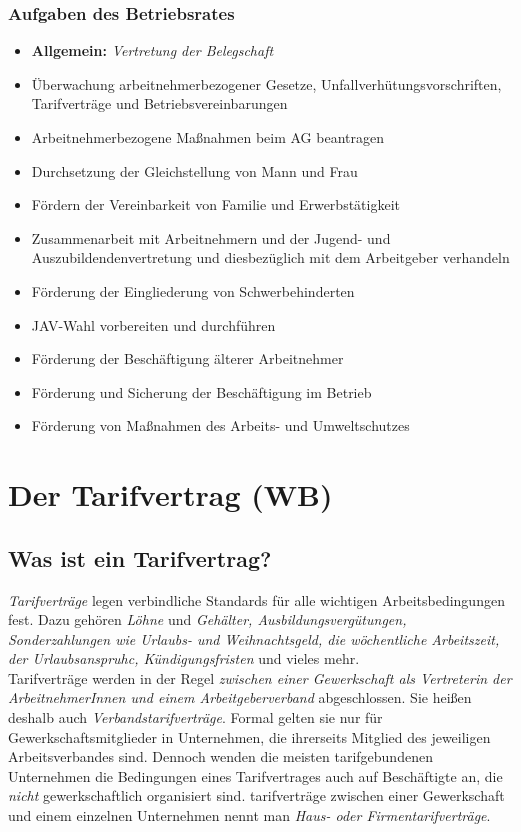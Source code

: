 \documentclass[a4paper, 12pt]{report}
\begin{document}
\begin{multicols}{2}
\subsubsection{Aufgaben des Betriebsrates}

\begin{itemize}
    \item \textbf{Allgemein:} \emph{Vertretung der Belegschaft}
    \item Überwachung arbeitnehmerbezogener Gesetze,
	Unfallverhütungsvorschriften, Tarifverträge und Betriebsvereinbarungen
    \item Arbeitnehmerbezogene Maßnahmen beim AG beantragen
    \item Durchsetzung der Gleichstellung von Mann und Frau
    \item Fördern der Vereinbarkeit von Familie und Erwerbstätigkeit
    \item Zusammenarbeit mit Arbeitnehmern und der Jugend- und
	Auszubildendenvertretung und diesbezüglich mit dem Arbeitgeber
	verhandeln
    \item Förderung der Eingliederung von Schwerbehinderten
    \item JAV-Wahl vorbereiten und durchführen
    \item Förderung der Beschäftigung älterer Arbeitnehmer
    \item Förderung und Sicherung der Beschäftigung im Betrieb
    \item Förderung von Maßnahmen des Arbeits- und Umweltschutzes
\end{itemize}

\section{Der Tarifvertrag (WB)}

\subsection{Was ist ein Tarifvertrag?}

\emph{Tarifverträge} legen verbindliche Standards für alle wichtigen
Arbeitsbedingungen fest. Dazu gehören \emph{Löhne} und \emph{Gehälter,
Ausbildungsvergütungen, Sonderzahlungen wie Urlaubs- und Weihnachtsgeld, die
wöchentliche Arbeitszeit, der Urlaubsanspruhc, Kündigungsfristen} und vieles
mehr. \\

Tarifverträge werden in der Regel \emph{zwischen einer Gewerkschaft als
Vertreterin der ArbeitnehmerInnen und einem Arbeitgeberverband} abgeschlossen.
Sie heißen deshalb auch \emph{Verbandstarifverträge}. Formal gelten sie nur für
Gewerkschaftsmitglieder in Unternehmen, die ihrerseits Mitglied des jeweiligen
Arbeitsverbandes sind. Dennoch wenden die meisten tarifgebundenen Unternehmen
die Bedingungen eines Tarifvertrages auch auf Beschäftigte an, die \emph{nicht}
gewerkschaftlich organisiert sind. tarifverträge zwischen einer Gewerkschaft und
einem einzelnen Unternehmen nennt man \emph{Haus- oder Firmentarifverträge}. \\


\end{multicols}
\end{document}
